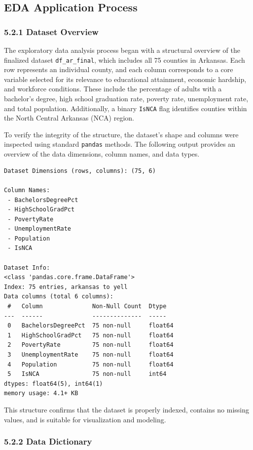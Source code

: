 \documentclass{llncs}
\begin{document}
\subsection{EDA Application Process}
\subsubsection{5.2.1 Dataset Overview}

The exploratory data analysis process began with a structural overview of the finalized dataset \texttt{df\_ar\_final}, which includes all 75 counties in Arkansas. Each row represents an individual county, and each column corresponds to a core variable selected for its relevance to educational attainment, economic hardship, and workforce conditions. These include the percentage of adults with a bachelor’s degree, high school graduation rate, poverty rate, unemployment rate, and total population. Additionally, a binary \texttt{IsNCA} flag identifies counties within the North Central Arkansas (NCA) region.

To verify the integrity of the structure, the dataset’s shape and columns were inspected using standard \texttt{pandas} methods. The following output provides an overview of the data dimensions, column names, and data types.

\begin{verbatim}
Dataset Dimensions (rows, columns): (75, 6)

Column Names:
 - BachelorsDegreePct
 - HighSchoolGradPct
 - PovertyRate
 - UnemploymentRate
 - Population
 - IsNCA

Dataset Info:
<class 'pandas.core.frame.DataFrame'>
Index: 75 entries, arkansas to yell
Data columns (total 6 columns):
 #   Column              Non-Null Count  Dtype  
---  ------              --------------  -----  
 0   BachelorsDegreePct  75 non-null     float64
 1   HighSchoolGradPct   75 non-null     float64
 2   PovertyRate         75 non-null     float64
 3   UnemploymentRate    75 non-null     float64
 4   Population          75 non-null     float64
 5   IsNCA               75 non-null     int64  
dtypes: float64(5), int64(1)
memory usage: 4.1+ KB
\end{verbatim}

This structure confirms that the dataset is properly indexed, contains no missing values, and is suitable for visualization and modeling.

\subsubsection{5.2.2 Data Dictionary}
\end{document}
